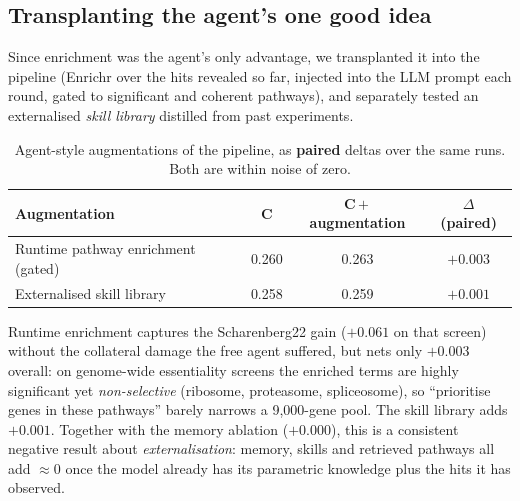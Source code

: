 \documentclass[11pt]{article}
\begin{document}
\subsection*{Transplanting the agent's one good idea}

Since enrichment was the agent's only advantage, we transplanted it into the pipeline (Enrichr over
the hits revealed so far, injected into the LLM prompt each round, gated to significant and coherent
pathways), and separately tested an externalised \emph{skill library} distilled from past experiments.

\begin{table}[H]
\centering
\caption{%
  Agent-style augmentations of the pipeline, as \textbf{paired} deltas over the same runs.
  Both are within noise of zero.
}
\label{tab:aug}
\setlength{\tabcolsep}{8pt}
\begin{tabular}{lccc}
\toprule
Augmentation & C & C\,$+$\,augmentation & $\Delta$ (paired) \\
\midrule
Runtime pathway enrichment (gated) & 0.260 & 0.263 & $+0.003$ \\
Externalised skill library         & 0.258 & 0.259 & $+0.001$ \\
\bottomrule
\end{tabular}
\end{table}

Runtime enrichment captures the Scharenberg22 gain ($+0.061$ on that screen) without the collateral
damage the free agent suffered, but nets only $+0.003$ overall: on genome-wide essentiality screens
the enriched terms are highly significant yet \emph{non-selective} (ribosome, proteasome,
spliceosome), so ``prioritise genes in these pathways'' barely narrows a 9{,}000-gene pool.
The skill library adds $+0.001$. Together with the memory ablation ($+0.000$), this is a consistent
negative result about \emph{externalisation}: memory, skills and retrieved pathways all add
$\approx 0$ once the model already has its parametric knowledge plus the hits it has observed.
\end{document}
